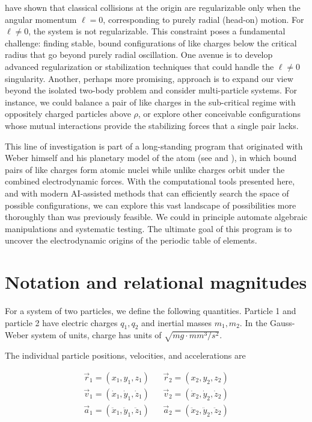 \documentclass[12pt,a4paper]{article}
\theoremstyle{definition}
\theoremstyle{remark}
\begin{document}
\citet{Frauenfelder2024} have shown that classical collisions at the origin are regularizable only when the angular momentum $\ell = 0$, corresponding to purely radial (head-on) motion. For $\ell \neq 0$, the system is not regularizable. This constraint poses a fundamental challenge: finding stable, bound configurations of like charges below the critical radius that go beyond purely radial oscillation. One avenue is to develop advanced regularization or stabilization techniques that could handle the $\ell \neq 0$ singularity. Another, perhaps more promising, approach is to expand our view beyond the isolated two-body problem and consider multi-particle systems. For instance, we could balance a pair of like charges in the sub-critical regime with oppositely charged particles above $\rho$, or explore other conceivable configurations whose mutual interactions provide the stabilizing forces that a single pair lacks.

This line of investigation is part of a long-standing program that originated with Weber himself and his planetary model of the atom (see \citep{assis-planetary-model} and \citep{assis-weber-vol4}), in which bound pairs of like charges form atomic nuclei while unlike charges orbit under the combined electrodynamic forces. With the computational tools presented here, and with modern AI-assisted methods that can efficiently search the space of possible configurations, we can explore this vast landscape of possibilities more thoroughly than was previously feasible. We could in principle automate algebraic manipulations and systematic testing. The ultimate goal of this program is to uncover the electrodynamic origins of the periodic table of elements.

\appendix

\section{Notation and relational magnitudes}\label{app:notation}
For a system of two particles, we define the following quantities. Particle 1 and particle 2 have electric charges $q_1, q_2$ and inertial masses $m_1, m_2$. In the Gauss-Weber system of units, charge has units of $\sqrt{mg \cdot mm^3 / s^2}$.

The individual particle positions, velocities, and accelerations are

\begin{align*}
    \vec{r}_1 = (x_1, y_1, z_1)                      &  & \vec{r}_2 = (x_2, y_2, z_2)                      \\
    \vec{v}_1 = (\dot{x}_1, \dot{y}_1, \dot{z}_1)    &  & \vec{v}_2 = (\dot{x}_2, \dot{y}_2, \dot{z}_2)    \\
    \vec{a}_1 = (\ddot{x}_1, \ddot{y}_1, \ddot{z}_1) &  & \vec{a}_2 = (\ddot{x}_2, \ddot{y}_2, \ddot{z}_2)
\end{align*}
\end{document}
